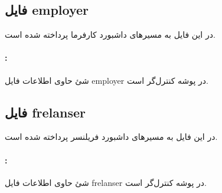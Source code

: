 \subsection{فایل employer}
در این فایل به مسیرهای داشبورد کارفرما پرداخته شده است.

\paragraph{:}
شئ حاوی اطلاعات فایل employer در پوشه کنترل‌گر است.

\subsection{فایل frelanser}
در این فایل به مسیرهای داشبورد فریلنسر پرداخته شده است.

\paragraph{:}
شئ حاوی اطلاعات فایل frelanser در پوشه کنترل‌گر است.

